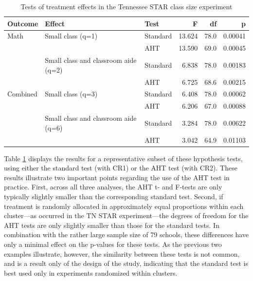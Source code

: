 \documentclass[12pt]{article}\usepackage[]{graphicx}\usepackage[]{color}
\begin{document}
\begin{table}[tbh]
\centering
\begin{tabular}{lllrrr}
  \toprule
Outcome & Effect & Test & F & df & p \\ 
  \midrule
Math & Small class (q=1) & Standard & 13.624 & 78.0 & 0.00041 \\ 
   &  & AHT & 13.590 & 69.0 & 0.00045 \\ 
   & Small class and classroom aide (q=2) & Standard & 6.838 & 78.0 & 0.00183 \\ 
   &  & AHT & 6.725 & 68.6 & 0.00215 \\ 
   \midrule
Combined & Small class (q=3) & Standard & 6.408 & 78.0 & 0.00062 \\ 
   &  & AHT & 6.206 & 67.0 & 0.00088 \\ 
   & Small class and classroom aide (q=6) & Standard & 3.284 & 78.0 & 0.00622 \\ 
   &  & AHT & 3.042 & 64.9 & 0.01103 \\ 
   \bottomrule
\end{tabular}
\caption{Tests of treatment effects in the Tennessee STAR class size experiment} 
\label{tab:STAR}
\end{table}


Table \ref{tab:STAR} displays the results for a representative subset of these hypothesis tests, using either the standard test (with CR1) or the AHT test (with CR2).
These results illustrate two important points regarding the use of the AHT test in practice.
First, across all three analyses, the AHT t- and F-tests are only typically slightly smaller than the corresponding standard test.
Second, if treatment is randomly allocated in approximately equal proportions within each cluster---as occurred in the TN STAR experiment---the degrees of freedom for the AHT tests are only slightly smaller than those for the standard tests.
In combination with the rather large sample size of 79 schools, these differences have only a minimal effect on the p-values for these tests. 
As the previous two examples illustrate, however, the similarity between these tests is not common, and is a result only of the design of the study, indicating that the standard test is best used only in experiments randomized within clusters. 
\end{document}
